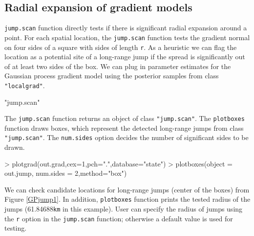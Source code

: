 \documentclass{article}
\newcommand{\code}[1]{{\tt #1}}
\begin{document}
\subsection{Radial expansion of gradient models}

\code{jump.scan} function directly tests if there is significant radial expansion around a point. For each spatial location, the \code{jump.scan} function tests the gradient normal on four sides of a square with sides of length \code{r}. As a  heuristic we can flag the location as a potential site of a long-range jump if the spread is significantly out of at least two sides of the box. We can plug in parameter estimates for the Gaussian process gradient model using the posterior samples from class \code{"localgrad"}.

\begin{Schunk}
\begin{Soutput}
[1] "jump.scan"
\end{Soutput}
\end{Schunk}

The \code{jump.scan} function returns an object of class \code{"jump.scan"}. The \code{plotboxes} function draws boxes, which represent the detected long-range jumps from class \code{"jump.scan"}. The \code{num.sides} option decides the number of significant sides to be drawn.

\begin{Schunk}
\begin{Sinput}
> plotgrad(out.grad,cex=1,pch=".",database="state")
> plotboxes(object = out.jump, num.sides = 2,method="box")
\end{Sinput}
\end{Schunk}

We can check candidate locations for long-range jumps (center of the boxes) from Figure \ref{GPjump1}. In addition, \code{plotboxes} function prints the tested radius of the jumps (61.84688{\tt km} in this example). User can specify the radius of jumps using the \code{r} option in the \code{jump.scan} function; otherwise a default value is used for testing.
\end{document}
